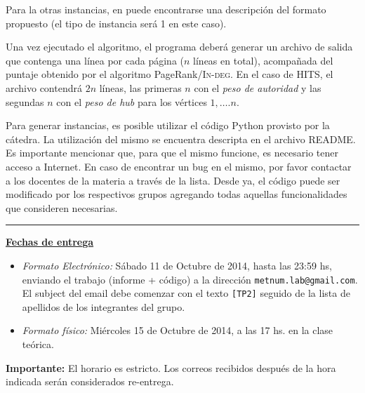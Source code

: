 \documentclass[11pt, a4paper]{article}
\begin{document}
Para la otras instancias, en \cite{dataset} puede encontrarse una descripci\'on del formato propuesto (el tipo de instancia ser\'a 1 en este caso).

Una vez ejecutado el algoritmo, el programa deber\'a generar un archivo de salida que contenga una l\'inea por cada
p\'agina ($n$ l\'ineas en total), acompa\~nada del puntaje obtenido por el algoritmo PageRank/\textsc{In-deg}. En el caso de HITS, el archivo 
contendr\'a $2n$ l\'ineas, las primeras $n$ con el \emph{peso de autoridad} y las segundas $n$ con el \emph{peso de hub} para los v\'ertices
$1,\dots.n$.

Para generar instancias, es posible utilizar el c\'odigo Python provisto por la c\'atedra. La utilizaci\'on del mismo se
encuentra descripta en el archivo README. Es importante mencionar que, para que el mismo funcione, es
necesario tener acceso a Internet. En caso de encontrar un bug en el mismo, por favor contactar a los docentes de la
materia a trav\'es de la lista. Desde ya, el c\'odigo puede ser modificado por los respectivos grupos agregando todas
aquellas funcionalidades que consideren necesarias.

\vskip 5pt

\hrule

\vskip 5pt


{\bf \underline{Fechas de entrega}}
\begin{itemize}
 \item \emph{Formato Electr\'onico:} S\'abado 11 de Octubre de 2014, hasta las 23:59 hs, enviando el trabajo (informe +
 c\'odigo) a la direcci\'on \verb+metnum.lab@gmail.com+. El subject del email debe comenzar con el texto \verb+[TP2]+
 seguido de la lista de apellidos  de los integrantes del grupo.
 \item \emph{Formato f\'isico:} Mi\'ercoles 15 de Octubre de 2014, a las 17 hs. en la clase te\'orica.
\end{itemize}

\noindent \textbf{Importante:} El horario es estricto. Los correos recibidos despu\'es de la hora indicada ser\'an considerados re-entrega.  



\end{document}
